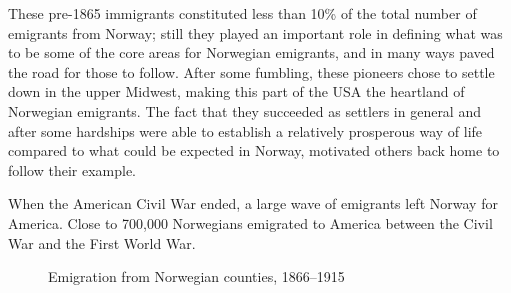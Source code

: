 \documentclass[output=paper]{langscibook}
\begin{document}
These pre-1865 immigrants constituted less than 10\% of the total number of emigrants from Norway; still they played an important role in defining what was to be some of the core areas for Norwegian emigrants, and in many ways paved the road for those to follow. After some fumbling, these pioneers chose to settle down in the upper Midwest, making this part of the USA the heartland of Norwegian emigrants. The fact that they succeeded as settlers in general and after some hardships were able to establish a relatively prosperous way of life compared to what could be expected in Norway, motivated others back home to follow their example. 

When the American Civil War ended, a large wave of emigrants left Norway for America. Close to 700,000 Norwegians emigrated to America between the Civil War and the First World War. 

\begin{figure}
\HjeldeFigureTwoData
\small
{}
\caption{Emigration from Norwegian counties, 1866--1915 \citep{Departementet1921}}
\end{figure} 
\end{document}
